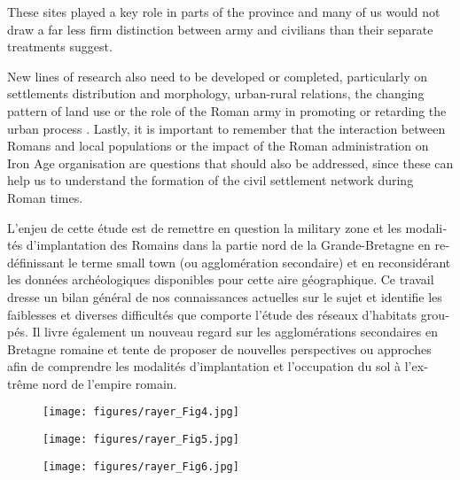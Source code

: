 \begin{aquote}{\cite[64]{Millett_2001}}
These sites played a key role in parts of the province and many of us would not draw a far less firm distinction between army and civilians than their separate treatments suggest.
\end{aquote}
New lines of research also need to be developed or completed, particularly on settlements distribution and morphology, urban-rural relations, the changing pattern of land use or the role of the Roman army in promoting or retarding the urban process \parencite[74--75]{Burnham_2001}. 
Lastly, it is important to remember that the interaction between Romans and local populations or the impact of the Roman administration on Iron Age organisation are questions that should also be addressed, since these can help us to understand the formation of the civil settlement network during Roman times.
\myseparator
\begin{myabstract}
\foreignlanguage{french}{%
		L’enjeu de cette étude est de remettre en question la military zone et les modalités d’implantation des Romains dans la partie nord de la Grande-Bretagne en redéfinissant le terme small town (ou agglomération secondaire) et en reconsidérant les données archéologiques disponibles pour cette aire géographique. Ce travail dresse un bilan général de nos connaissances actuelles sur le sujet et identifie les faiblesses et diverses difficultés que comporte l’étude des réseaux d’habitats groupés. Il livre également un nouveau regard sur les agglomérations secondaires en Bretagne romaine et tente de proposer de nouvelles perspectives ou approches afin de comprendre les modalités d’implantation et l’occupation du sol à l’extrême nord de l’empire romain.
	}		
\end{myabstract}
\clearpage
\begin{figure}[!p]
		\texttt{[image: figures/rayer\_Fig4.jpg]}
		\label{fig:Rayer_Fig4}
	\end{figure}
	
		\begin{figure}[!p]
			\texttt{[image: figures/rayer\_Fig5.jpg]}
			\label{fig:Rayer_Fig5}
		\end{figure}
		
			\begin{figure}[!p]
				\texttt{[image: figures/rayer\_Fig6.jpg]}
				\label{fig:Rayer_Fig6}
			\end{figure}
			
